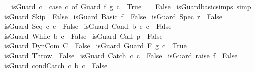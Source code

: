 \begin{isabellebody}
\ \ \ {\isachardoublequoteopen}is{\isacharunderscore}Guard\ c\ {\isacharequal}\ {\isacharparenleft}case\ c\ of\ Guard\ f\ g\ c{\isacharprime}\ {\isasymRightarrow}\ True\ {\isacharbar}\ {\isacharunderscore}\ {\isasymRightarrow}\ False{\isacharparenright}{\isachardoublequoteclose}\isanewline
{}\isamarkupfalse%
\ is{\isacharunderscore}Guard{\isacharunderscore}basic{\isacharunderscore}simps\ {\isacharbrackleft}simp{\isacharbrackright}{\isacharcolon}\isanewline
\ {\isachardoublequoteopen}is{\isacharunderscore}Guard\ Skip\ {\isacharequal}\ False{\isachardoublequoteclose}\isanewline
\ {\isachardoublequoteopen}is{\isacharunderscore}Guard\ {\isacharparenleft}Basic\ f{\isacharparenright}\ {\isacharequal}\ False{\isachardoublequoteclose}\isanewline
\ {\isachardoublequoteopen}is{\isacharunderscore}Guard\ {\isacharparenleft}Spec\ r{\isacharparenright}\ {\isacharequal}\ False{\isachardoublequoteclose}\isanewline
\ {\isachardoublequoteopen}is{\isacharunderscore}Guard\ {\isacharparenleft}Seq\ c{}\ c{}{\isacharparenright}\ {\isacharequal}\ False{\isachardoublequoteclose}\isanewline
\ {\isachardoublequoteopen}is{\isacharunderscore}Guard\ {\isacharparenleft}Cond\ b\ c{}\ c{}{\isacharparenright}\ {\isacharequal}\ False{\isachardoublequoteclose}\isanewline
\ {\isachardoublequoteopen}is{\isacharunderscore}Guard\ {\isacharparenleft}While\ b\ c{\isacharparenright}\ {\isacharequal}\ False{\isachardoublequoteclose}\isanewline
\ {\isachardoublequoteopen}is{\isacharunderscore}Guard\ {\isacharparenleft}Call\ p{\isacharparenright}\ {\isacharequal}\ False{\isachardoublequoteclose}\isanewline
\ {\isachardoublequoteopen}is{\isacharunderscore}Guard\ {\isacharparenleft}DynCom\ C{\isacharparenright}\ {\isacharequal}\ False{\isachardoublequoteclose}\isanewline
\ {\isachardoublequoteopen}is{\isacharunderscore}Guard\ {\isacharparenleft}Guard\ F\ g\ c{\isacharparenright}\ {\isacharequal}\ True{\isachardoublequoteclose}\isanewline
\ {\isachardoublequoteopen}is{\isacharunderscore}Guard\ {\isacharparenleft}Throw{\isacharparenright}\ {\isacharequal}\ False{\isachardoublequoteclose}\isanewline
\ {\isachardoublequoteopen}is{\isacharunderscore}Guard\ {\isacharparenleft}Catch\ c{}\ c{}{\isacharparenright}\ {\isacharequal}\ False{\isachardoublequoteclose}\isanewline
\ {\isachardoublequoteopen}is{\isacharunderscore}Guard\ {\isacharparenleft}raise\ f{\isacharparenright}\ {\isacharequal}\ False{\isachardoublequoteclose}\isanewline
\ {\isachardoublequoteopen}is{\isacharunderscore}Guard\ {\isacharparenleft}condCatch\ c{}\ b\ c{}{\isacharparenright}\ {\isacharequal}\ False{\isachardoublequoteclose}\isanewline

\end{isabellebody}
